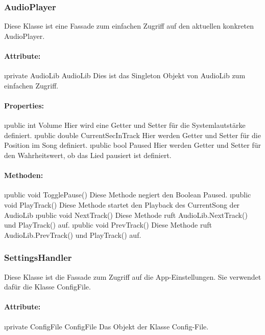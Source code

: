 \documentclass[../entwurf.tex]{subfiles}
\begin{document}
			\subsubsection{AudioPlayer}
				Diese Klasse ist eine Fassade zum einfachen Zugriff auf den aktuellen konkreten AudioPlayer.
				\paragraph{Attribute:}
					\begin{itemize}
						\i{private AudioLib AudioLib} Dies ist das Singleton Objekt von AudioLib zum einfachen Zugriff.
					\end{itemize}
				\paragraph{Properties:}
					\begin{itemize}
						\i{public int Volume} Hier wird eine Getter und Setter für die Systemlautstärke definiert.
						\i{public double CurrentSecInTrack} Hier werden Getter und Setter für die Position im Song definiert.
						\i{public bool Paused} Hier werden Getter und Setter für den Wahrheitswert, ob das Lied pausiert ist definiert.
					\end{itemize}
				\paragraph{Methoden:}
					\begin{itemize}
						\i{public void TogglePause()} Diese Methode negiert den Boolean Paused.
						\i{public void PlayTrack()} Diese Methode startet den Playback des CurrentSong der AudioLib
						\i{public void NextTrack()} Diese Methode ruft AudioLib.NextTrack() und PlayTrack() auf.
						\i{public void PrevTrack()} Diese Methode ruft AudioLib.PrevTrack() und PlayTrack() auf.
					\end{itemize}
			\subsubsection{SettingsHandler}
				Diese Klasse ist die Fassade zum Zugriff auf die App-Einstellungen. Sie verwendet dafür die Klasse ConfigFile.
				\paragraph{Attribute:}
					\begin{itemize}
						\i{private ConfigFile ConfigFile} Das Objekt der Klasse Config-File.
					\end{itemize}
\end{document}

